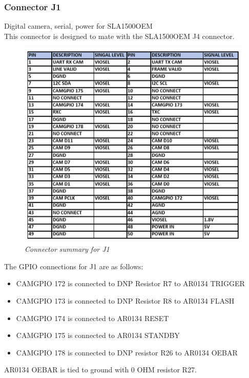 \documentclass[11pt]{article}
\begin{document}
\subsubsection{Connector J1}

Digital camera, serial, power for SLA1500OEM
\\
This connector is designed to mate with the SLA1500OEM J4 connector. 

    \begin{figure}[H]
	\centering	
	\includegraphics[width=6 in]{CONN_J1}
	\caption{\textit{Connector summary for J1}}	
	\end{figure}

 The GPIO connections for J1 are as follows:

\begin{itemize}

\item CAMGPIO 172 is connected to DNP Resistor R7 to AR0134 TRIGGER
\item CAMGPIO 173  is connected to DNP Resistor R8 to AR0134 FLASH
\item CAMGPIO 174  is connected to AR0134 RESET
\item CAMGPIO 175  is connected to AR0134 STANDBY
\item CAMGPIO 178 is connected to DNP resistor R26 to AR0134 OEBAR
\end{itemize}

AR0134 OEBAR is tied to ground with 0 OHM resistor R27.
\end{document}
